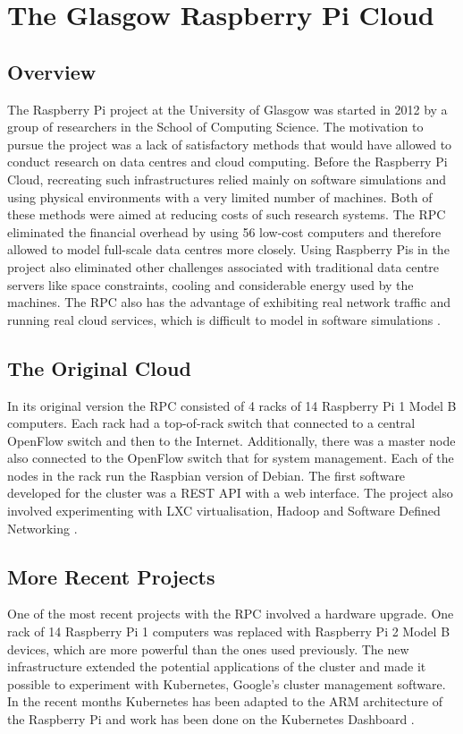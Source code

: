 \documentclass{l4proj}
\begin{document}
\section{The Glasgow Raspberry Pi Cloud}
\label{the_glasgow_picloud}
\subsection{Overview}
The Raspberry Pi project at the University of Glasgow was started in 2012 by a group of researchers in the School of Computing Science. The motivation to pursue the project was a lack of satisfactory methods that would have allowed to conduct research on data centres and cloud computing. Before the Raspberry Pi Cloud, recreating such infrastructures relied mainly on software simulations and using physical environments with a very limited number of machines. Both of these methods were aimed at reducing costs of such research systems. The RPC eliminated the financial overhead by using 56 low-cost computers and therefore allowed to model full-scale data centres more closely. Using Raspberry Pis in the project also eliminated other challenges associated with traditional data centre servers like space constraints, cooling and considerable energy used by the machines. The RPC also has the advantage of exhibiting real network traffic and running real cloud services, which is difficult to model in software simulations \cite{tso_white_jouet_singer_pezaros_2013}.

\subsection{The Original Cloud}
In its original version the RPC consisted of 4 racks of 14 Raspberry Pi 1 Model B computers. Each rack had a top-of-rack switch that connected to a central OpenFlow switch and then to the Internet. Additionally, there was a master node also connected to the OpenFlow switch that for system management. Each of the nodes in the rack run the Raspbian version of Debian. The first software developed for the cluster was a REST API with a web interface. The project also involved experimenting with LXC virtualisation, Hadoop and Software Defined Networking \cite{white_2013}.

\subsection{More Recent Projects}
One of the most recent projects with the RPC involved a hardware upgrade. One rack of 14 Raspberry Pi 1 computers was replaced with Raspberry Pi 2 Model B devices, which are more powerful than the ones used previously. The new infrastructure extended the potential applications of the cluster and made it possible to experiment with Kubernetes, Google's cluster management software. In the recent months Kubernetes has been adapted to the ARM architecture of the Raspberry Pi \cite{walker_2015} and work has been done on the Kubernetes Dashboard \cite{mcwha_2016}.
\end{document}
